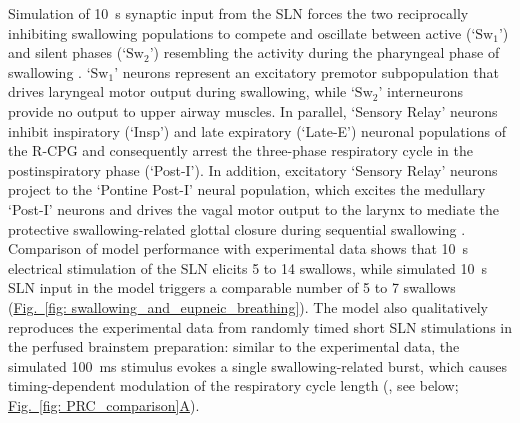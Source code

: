 \documentclass[pdflatex,sn-mathphys-ay]{sn-jnl}%
\renewcommand{\figureautorefname}{Fig.}
\newcommand{\Figref}[2][]{\hyperref[#2]{\figureautorefname~\ref*{#2}#1}}
\theoremstyle{thmstyleone}%
\theoremstyle{thmstyletwo}%
\theoremstyle{thmstylethree}%
\begin{document}
Simulation of 10~s synaptic input from the SLN forces the two reciprocally inhibiting swallowing populations to compete and oscillate between active (`$\text{Sw}_1$') and silent phases (`$\text{Sw}_2$') resembling the activity during the pharyngeal phase of swallowing \citep{hashimoto2019activity, bautista2014generation, kinoshita2021influences, jean2001brain}. `$\text{Sw}_1$' neurons represent an excitatory premotor subpopulation that drives laryngeal motor output during swallowing, while `$\text{Sw}_2$' interneurons provide no output to upper airway muscles. In parallel, `Sensory Relay' neurons inhibit inspiratory (`Insp') and late expiratory (`Late-E') neuronal populations of the R-CPG and consequently arrest the three-phase respiratory cycle in the postinspiratory phase (`Post-I'). In addition, excitatory `Sensory Relay' neurons project to the `Pontine Post-I' neural population, which excites the medullary `Post-I' neurons and drives the vagal motor output to the larynx to mediate the protective swallowing-related glottal closure during sequential swallowing \citep{bautista2014ponto}. Comparison of model performance with experimental data shows that 10~s electrical stimulation of the SLN elicits 5 to 14 swallows, while simulated 10~s SLN input in the model triggers a comparable number of 5 to 7 swallows (\Figref[]{fig: swallowing_and_eupneic_breathing}). The model also qualitatively reproduces the experimental data from randomly timed short SLN stimulations in the perfused brainstem preparation: similar to the experimental data, the simulated 100~ms stimulus evokes a single swallowing-related burst, which causes timing-dependent modulation of the respiratory cycle length (\citet{lewis1990effects, oku1992phase}, see below; \Figref[A]{fig: PRC_comparison}).
\end{document}
